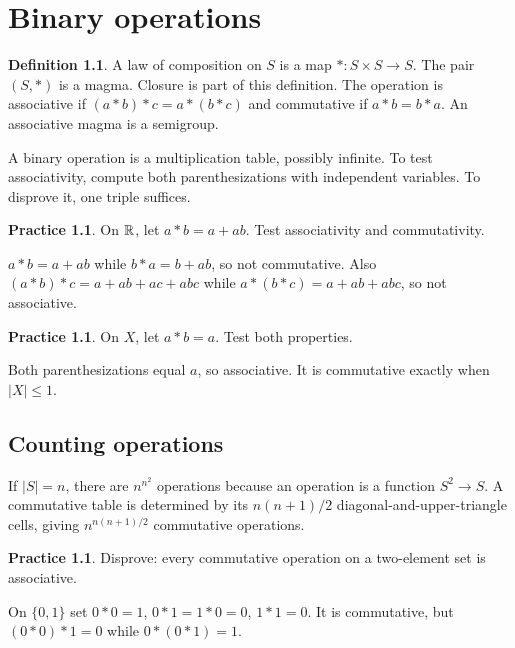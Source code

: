 \documentclass[11pt,openany]{book}
\theoremstyle{definition}
\newtheorem{definition}[theorem]{Definition}
\newtheorem{exercise}[theorem]{Practice}
\begin{document}
\chapter{Binary operations}
\begin{definition}A law of composition on $S$ is a map $*:S\times S\to S$. The pair $(S,*)$ is a magma. Closure is part of this definition. The operation is associative if $(a*b)*c=a*(b*c)$ and commutative if $a*b=b*a$. An associative magma is a semigroup.\end{definition}
\begin{intuition}A binary operation is a multiplication table, possibly infinite. To test associativity, compute both parenthesizations with independent variables. To disprove it, one triple suffices.\end{intuition}
\begin{exercise}On $\mathbb R$, let $a*b=a+ab$. Test associativity and commutativity.\end{exercise}
\begin{solution}$a*b=a+ab$ while $b*a=b+ab$, so not commutative. Also $(a*b)*c=a+ab+ac+abc$ while $a*(b*c)=a+ab+abc$, so not associative.\end{solution}
\begin{exercise}On $X$, let $a*b=a$. Test both properties.\end{exercise}
\begin{solution}Both parenthesizations equal $a$, so associative. It is commutative exactly when $|X|\le1$.\end{solution}

\section{Counting operations}
If $|S|=n$, there are $n^{n^2}$ operations because an operation is a function $S^2\to S$. A commutative table is determined by its $n(n+1)/2$ diagonal-and-upper-triangle cells, giving $n^{n(n+1)/2}$ commutative operations.
\begin{exercise}Disprove: every commutative operation on a two-element set is associative.\end{exercise}
\begin{solution}On $\{0,1\}$ set $0*0=1$, $0*1=1*0=0$, $1*1=0$. It is commutative, but $(0*0)*1=0$ while $0*(0*1)=1$.\end{solution}
\end{document}
